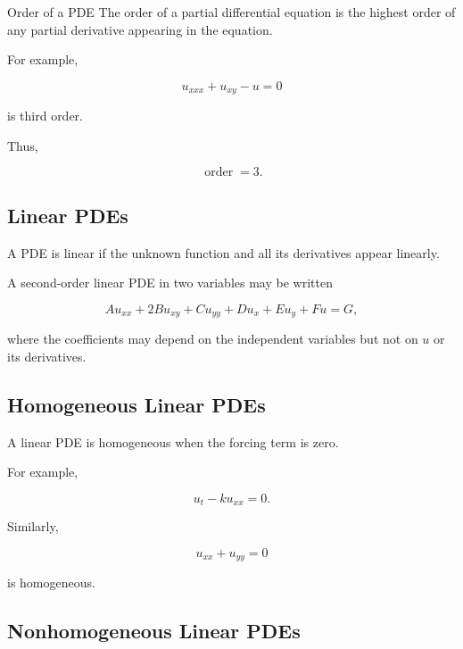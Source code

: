 \begin{definitionbox}{Order of a PDE}
The order of a partial differential equation is the highest order of any
partial derivative appearing in the equation.
\end{definitionbox}

For example,

\[
u_{xxx}
+
u_{xy}
-
u
=
0
\]

is third order.

Thus,

\[
\boxed{
\operatorname{order}=3.
}
\]

\subsection{Linear PDEs}
\label{subsec:linear-pdes}

A PDE is linear if the unknown function and all its derivatives appear
linearly.

A second-order linear PDE in two variables may be written

\[
\boxed{
A u_{xx}
+
2B u_{xy}
+
C u_{yy}
+
D u_x
+
E u_y
+
F u
=
G,
}
\]

where the coefficients may depend on the independent variables but not on
\(u\) or its derivatives.

\subsection{Homogeneous Linear PDEs}
\label{subsec:homogeneous-linear-pdes}

A linear PDE is homogeneous when the forcing term is zero.

For example,

\[
\boxed{
u_t-ku_{xx}=0.
}
\]

Similarly,

\[
\boxed{
u_{xx}+u_{yy}=0
}
\]

is homogeneous.

\subsection{Nonhomogeneous Linear PDEs}
\label{subsec:nonhomogeneous-linear-pdes}

